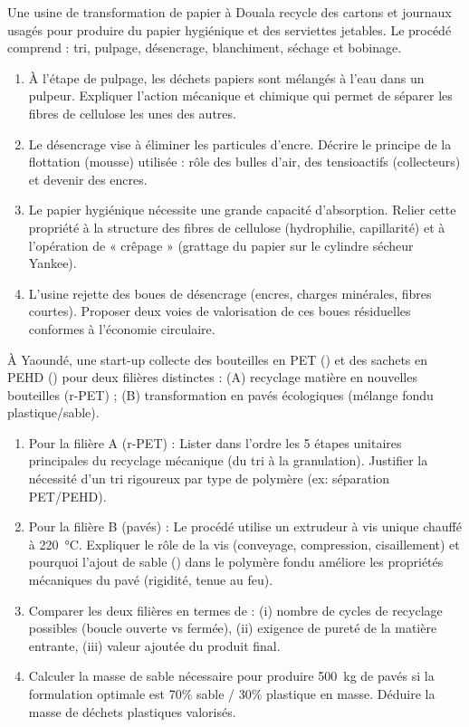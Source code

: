 \documentclass[11pt]{article}
\begin{document}
\begin{exercice}
Une usine de transformation de papier à Douala recycle des cartons et journaux usagés pour produire du papier hygiénique et des serviettes jetables. Le procédé comprend : tri, pulpage, désencrage, blanchiment, séchage et bobinage.
\begin{enumerate}
    \item À l'étape de pulpage, les déchets papiers sont mélangés à l'eau dans un pulpeur. Expliquer l'action mécanique et chimique qui permet de séparer les fibres de cellulose les unes des autres.
    \item Le désencrage vise à éliminer les particules d'encre. Décrire le principe de la flottation (mousse) utilisée : rôle des bulles d'air, des tensioactifs (collecteurs) et devenir des encres.
    \item Le papier hygiénique nécessite une grande capacité d'absorption. Relier cette propriété à la structure des fibres de cellulose (hydrophilie, capillarité) et à l'opération de « crêpage » (grattage du papier sur le cylindre sécheur Yankee).
    \item L'usine rejette des boues de désencrage (encres, charges minérales, fibres courtes). Proposer deux voies de valorisation de ces boues résiduelles conformes à l'économie circulaire.
\end{enumerate}
\end{exercice}

\begin{exercice}
À Yaoundé, une start-up collecte des bouteilles en PET () et des sachets en PEHD () pour deux filières distinctes : (A) recyclage matière en nouvelles bouteilles (r-PET) ; (B) transformation en pavés écologiques (mélange fondu plastique/sable).
\begin{enumerate}
    \item Pour la filière A (r-PET) : Lister dans l'ordre les 5 étapes unitaires principales du recyclage mécanique (du tri à la granulation). Justifier la nécessité d'un tri rigoureux par type de polymère (ex: séparation PET/PEHD).
    \item Pour la filière B (pavés) : Le procédé utilise un extrudeur à vis unique chauffé à \SI{220}{\celsius}. Expliquer le rôle de la vis (conveyage, compression, cisaillement) et pourquoi l'ajout de sable () dans le polymère fondu améliore les propriétés mécaniques du pavé (rigidité, tenue au feu).
    \item Comparer les deux filières en termes de : (i) nombre de cycles de recyclage possibles (boucle ouverte vs fermée), (ii) exigence de pureté de la matière entrante, (iii) valeur ajoutée du produit final.
    \item Calculer la masse de sable nécessaire pour produire \SI{500}{kg} de pavés si la formulation optimale est 70\% sable / 30\% plastique en masse. Déduire la masse de déchets plastiques valorisés.
\end{enumerate}
\end{exercice}
\end{document}
